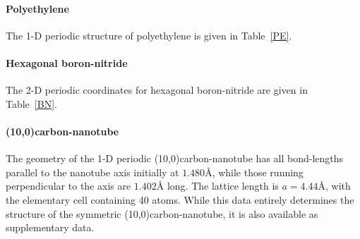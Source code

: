 \twolinestyle{\documentclass[prb,preprint]{revtex4}}
\begin{document}
\paragraph{Polyethylene}
The 1-D periodic structure of polyethylene is given in Table~\ref{PE}.
\paragraph{Hexagonal boron-nitride}
The 2-D periodic coordinates for hexagonal boron-nitride are given in Table~\ref{BN}.
\paragraph{(10,0)carbon-nanotube}
The geometry of the 1-D periodic (10,0)carbon-nanotube has 
all bond-lengths parallel to the nanotube axis initially at $1.480${\AA}, 
while those running perpendicular to the axis are $1.402${\AA} long.
The lattice length is $a=4.44${\AA}, with the elementary cell containing 
40 atoms. While this data entirely determines the structure of the symmetric 
(10,0)carbon-nanotube, it is also available as supplementary data.
\end{document}
